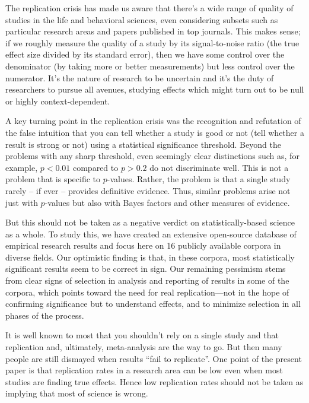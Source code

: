 \documentclass[11pt]{article}
\begin{document}
The replication crisis has made us aware that there's a wide range of quality of studies in the life and behavioral sciences, even considering subsets such as particular research areas and papers published in top journals.  This makes sense; if we roughly measure the quality of a study by its signal-to-noise ratio (the true effect size divided by its standard error), then we have some control over the denominator (by taking more or better measurements) but less control over the numerator. It's the nature of research to be uncertain and it's the duty of researchers to pursue all avenues, studying effects which might turn out to be null or highly context-dependent.

A key turning point in the replication crisis was the recognition and refutation of the false intuition that you can tell whether a study is good or not (tell whether a result is strong or not) using a statistical significance threshold.  Beyond the problems with any sharp threshold, even seemingly clear distinctions such as, for example, $p < 0.01$ compared to $p > 0.2$ do not discriminate well. This is not a problem that is specific to $p$-values. Rather, the problem is that a single study rarely -- if ever -- provides definitive evidence. Thus, similar problems arise not just with $p$-values but also with Bayes factors and other measures of evidence. 

But this should not be taken as a negative verdict on statistically-based science as a whole. To study this, we have created an extensive open-source database of empirical research results and focus here on 16 publicly available corpora in diverse fields.  Our optimistic finding is that, in these corpora, most statistically significant results seem to be correct in sign.  Our remaining pessimism stems from clear signs of selection in analysis and reporting of results in some of the corpora, which points toward the need for real replication---not in the hope of confirming significance but to understand effects, and to minimize selection in all phases of the process.

It is well known to most that you shouldn't rely on a single study and that replication and, ultimately, meta-analysis are the way to go.  But then many people are still dismayed when results ``fail to replicate''.  One point of the present paper is that replication rates in a research area can be low even when most studies are finding true effects. Hence low replication rates should not be taken as implying that most of science is wrong.
\end{document}
